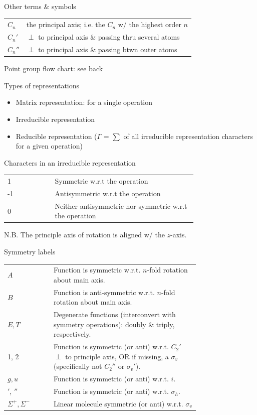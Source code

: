 \documentclass[10pt,landscape]{article}
\newcommand{\halfline}{\vspace{0.5em}}
\newcommand{\tableindent}{\hspace{1.5em}}
\begin{document}
\begin{multicols}{3}
Other terms \& symbols
\renewcommand{\arraystretch}{1.4}
\begin{tabular}{@{\tableindent}lp{0,8\linewidth}@{}}
	$C_n$ & the principal axis; i.e. the $C_n$ w/ the highest order $n$ \\
	$C_n'$ & $\perp$ to principal axis \& passing thru several atoms \\
	$C_n''$ & $\perp$ to principal axis \& passing btwn outer atoms \\
\end{tabular}
\renewcommand{\arraystretch}{1}

Point group flow chart: see back

\columnbreak
Types of representations
\begin{itemize}
	\item Matrix representation: for a single operation
	\item Irreducible representation
	\item Reducible representation ($\Gamma$ = $\sum$ of all irreducible representation characters for a given operation)
\end{itemize}

Characters in an irreducible representation
\begin{tabular}{@{\tableindent}lp{0.75\linewidth}@{}}
	1 & Symmetric w.r.t the operation \\
	-1 & Antisymmetric w.r.t the operation \\
	0 & Neither antisymmetric nor symmetric w.r.t the operation \\
\end{tabular}

\tableindent N.B. The principle axis of rotation is aligned w/ the $z$-axis.
\halfline

Symmetry labels
%
\renewcommand{\arraystretch}{1.4}
\begin{tabular}{@{\tableindent}lp{0.76\linewidth}@{}}
	$A$ & Function is symmetric w.r.t. $n$-fold rotation about main axis. \\
	$B$ & Function is anti-symmetric w.r.t. $n$-fold rotation about main axis. \\
	$E, T$ & Degenerate functions (interconvert with symmetry operations): doubly \& triply, respectively. \\
	1, 2 & Function is symmetric (or anti) w.r.t. $C_2'$ $\perp$ to principle axis, OR if missing, a $\sigma_v$ (specifically not $C_2''$ or $\sigma_v'$). \\
	$g, u$ & Function is symmetric (or anti) w.r.t. $i$. \\
	$'$, $''$ & Function is symmetric (or anti) w.r.t. $\sigma_h$. \\
	$\Sigma^+, \Sigma^-$ & Linear molecule symmetric (or anti) w.r.t. $\sigma_v$ \\
\end{tabular}
\renewcommand{\arraystretch}{1}
\medskip


\end{multicols}
\end{document}
